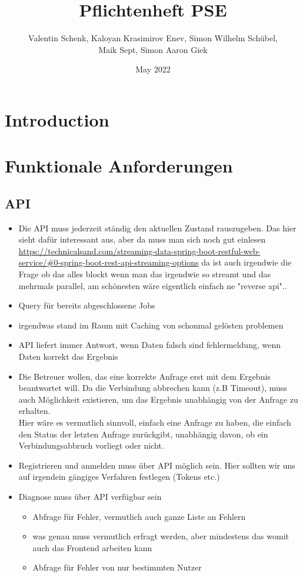 \documentclass{article}
\title{Pflichtenheft PSE}
\author{Valentin Schenk, Kaloyan Krasimirov Enev, Simon Wilhelm Schübel,\\ Maik Sept, Simon Aaron Giek}
\date{May 2022}
\begin{document}
\maketitle

\section{Introduction}

\section{Funktionale Anforderungen}


\subsection{API}
\begin{itemize}
    \item Die API muss jederzeit ständig den aktuellen Zustand rauszugeben. Das hier sieht dafür interessant aus, aber da muss man sich noch gut einlesen
    \url{https://technicalsand.com/streaming-data-spring-boot-restful-web-service/#0-spring-boot-rest-api-streaming-options} da ist auch irgendwie die Frage ob das alles blockt wenn man das irgendwie so streamt und das mehrmals parallel, am schönesten wäre eigentlich einfach ne "reverse api"..
    \item Query für bereits abgeschlossene Jobs
    \item irgendwas stand im Raum mit Caching von schonmal gelösten problemen
    \item API liefert immer Antwort, wenn Daten falsch sind fehlermeldung, wenn Daten korrekt das
        Ergebnis
    \item Die Betreuer wollen, das eine korrekte Anfrage erst mit dem Ergebnis beantwortet will. Da die Verbindung abbrechen kann     (z.B Timeout), muss auch Möglichkeit existieren, um das Ergebnis unabhängig von der Anfrage zu erhalten.\\
        Hier wäre es vermutlich sinnvoll, einfach eine Anfrage zu haben, die einfach den Status der letzten Anfrage zurückgibt, unabhängig davon, ob ein Verbindungsabbruch vorliegt oder nicht.

    \item Registrieren und anmelden muss über API möglich sein. Hier sollten wir uns auf irgendein gängiges Verfahren festlegen (Tokens etc.)
    \item Diagnose muss über API verfügbar sein
        \begin{itemize}
            \item Abfrage für Fehler, vermutlich auch ganze Liste an Fehlern
            \item was genau muss vermutlich erfragt werden, aber mindestens das womit auch das Frontend arbeiten kann
            \item Abfrage für Fehler von nur bestimmten Nutzer
        \end{itemize}


\end{itemize}
\end{document}
